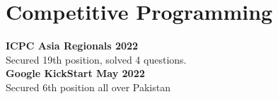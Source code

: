 \documentclass[]{m abbas resume' 2022}
\begin{document}
\begin{minipage}[t]{0.45\textwidth}

\section{Competitive Programming} 
\textbf{ICPC Asia Regionals 2022}\\
Secured 19th position, solved 4 questions. \\ 
\textbf{Google KickStart May 2022}\\
Secured 6th position all over Pakistan%


\end{minipage} 
\end{document}

